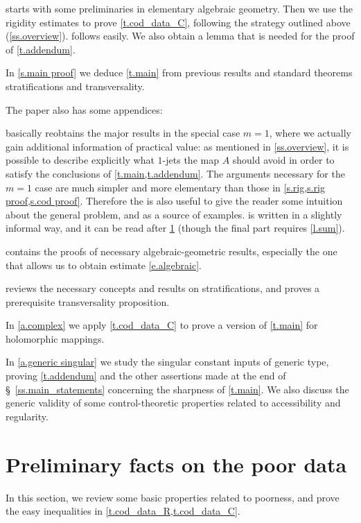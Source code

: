 \documentclass[10pt, a4paper]{amsart}
\theoremstyle{plain}
\theoremstyle{definition}
\theoremstyle{remark}
\theoremstyle{note}
\numberwithin{equation}{section}
\begin{document}
 starts with some preliminaries in elementary algebraic geometry.
Then we use the rigidity estimates to prove \cref{t.cod_data_C}, following the strategy 
outlined above (\cref{ss.overview}).
 follows easily.
We also obtain a lemma that is needed for the proof of \cref{t.addendum}.

In \cref{s.main proof} we deduce \cref{t.main}
from  previous results and standard theorems stratifications and transversality.

The paper also has some appendices:

 basically reobtains the major results in the special case $m=1$,
where we actually gain additional information of practical value:
as mentioned in \cref{ss.overview}, it is possible to describe explicitly what $1$-jets
the map $A$ should avoid in order to satisfy the conclusions of \cref{t.main,t.addendum}.
The arguments necessary for the $m=1$ case are much simpler and more elementary
than those in \cref{s.rig,s.rig proof,s.cod proof}.
Therefore the  is also useful to give the reader some intuition about the
general problem, and as a source of examples.
 is written in a slightly informal way, and it can be read after \cref{s.prelim_poor}
(though the final part requires \cref{l.sum}).

 contains the proofs of necessary algebraic-geometric results,
especially the one that allows us to obtain estimate \eqref{e.algebraic}.

 reviews the necessary concepts and results on stratifications,
and proves a prerequisite transversality proposition.

In \cref{a.complex} we apply \cref{t.cod_data_C} 
to prove a version of \cref{t.main} for holomorphic mappings.

In \cref{a.generic singular} we study the singular constant inputs of generic type,
proving \cref{t.addendum} and the other assertions made at the end of \S~\ref{ss.main_statements}
concerning the sharpness of \cref{t.main}.
We also discuss the generic validity of some control-theoretic properties 
related to accessibility and regularity.

\section{Preliminary facts on the poor data}\label{s.prelim_poor}

In this section, we review some basic properties 
related to poorness, and prove the easy inequalities in \cref{t.cod_data_R,t.cod_data_C}.
\end{document}
